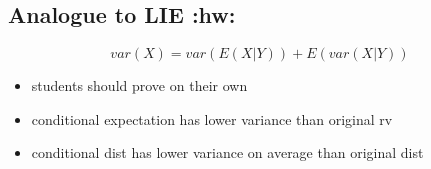 \documentclass[11pt]{article}
\begin{document}
\subsection{Analogue to LIE \textbf{:hw:}}
\label{sec-4-3}

     \[var(X) = var(E(X|Y)) + E(var(X|Y))\]
\begin{itemize}
\item students should prove on their own
\item conditional expectation has lower variance than original rv
\item conditional dist has lower variance on average than original
         dist
\end{itemize}
         
\end{document}

